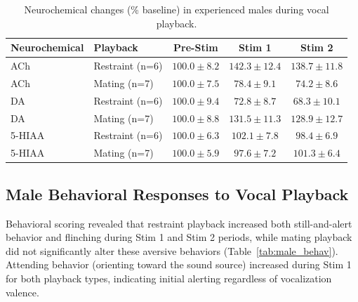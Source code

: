 \documentclass[11pt]{article}
\begin{document}
\begin{table}[H]
\centering
\caption{Neurochemical changes (\% baseline) in experienced males during vocal playback.}
\label{tab:male_neuro}
\begin{tabular}{llccc}
\toprule
\textbf{Neurochemical} & \textbf{Playback} & \textbf{Pre-Stim} & \textbf{Stim 1} & \textbf{Stim 2} \\
\midrule
ACh & Restraint (n=6) & $100.0 \pm 8.2$ & $142.3 \pm 12.4$ & $138.7 \pm 11.8$ \\
ACh & Mating (n=7) & $100.0 \pm 7.5$ & $78.4 \pm 9.1$ & $74.2 \pm 8.6$ \\
DA & Restraint (n=6) & $100.0 \pm 9.4$ & $72.8 \pm 8.7$ & $68.3 \pm 10.1$ \\
DA & Mating (n=7) & $100.0 \pm 8.8$ & $131.5 \pm 11.3$ & $128.9 \pm 12.7$ \\
5-HIAA & Restraint (n=6) & $100.0 \pm 6.3$ & $102.1 \pm 7.8$ & $98.4 \pm 6.9$ \\
5-HIAA & Mating (n=7) & $100.0 \pm 5.9$ & $97.6 \pm 7.2$ & $101.3 \pm 6.4$ \\
\bottomrule
\end{tabular}
\end{table}

\subsection{Male Behavioral Responses to Vocal Playback}

Behavioral scoring revealed that restraint playback increased both still-and-alert behavior and flinching during Stim 1 and Stim 2 periods, while mating playback did not significantly alter these aversive behaviors (Table~\ref{tab:male_behav}). Attending behavior (orienting toward the sound source) increased during Stim 1 for both playback types, indicating initial alerting regardless of vocalization valence.
\end{document}
